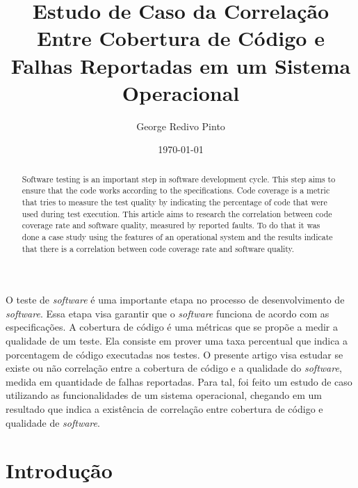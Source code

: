 \documentclass[11.5pt]{article}
\date{\today}
\title{
    Estudo de Caso da Correlação Entre Cobertura de Código e Falhas Reportadas em um Sistema
    Operacional
}
\author{George Redivo Pinto}
\begin{document}
\imprimircapa
\imprimirfolhaderosto

\maketitle

\begin{abstract}

Software testing is an important step in software development cycle. This step aims to ensure that
the code works according to the specifications.
Code coverage is a metric that tries to measure the test quality by indicating the percentage of
code that were used during test execution.
This article aims to research the correlation between code coverage rate and software quality,
measured by reported faults.
To do that it was done a case study using the features of an operational system and the results
indicate that there is a correlation between code coverage rate and software quality.

\end{abstract}

\begin{resumo}

O teste de \textit{software} é uma importante etapa no processo de desenvolvimento de
\textit{software}.
Essa etapa visa garantir que o \textit{software} funciona de acordo com as especificações.
A cobertura de código é uma métricas que se propõe a medir a qualidade de um teste. Ela consiste em
prover uma taxa percentual que indica a porcentagem de código executadas nos testes.
O presente artigo visa estudar se existe ou não correlação entre a cobertura de código e a
qualidade do \textit{software}, medida em quantidade de falhas reportadas.
Para tal, foi feito um estudo de caso utilizando as funcionalidades de um sistema operacional,
chegando em um resultado que indica a existência de correlação entre cobertura de código e
qualidade de \textit{software}.


\end{resumo}




\section{Introdução}
\end{document}
